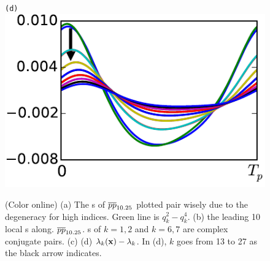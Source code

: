 \documentclass[prl,aps,preprint,showpacs]{revtex4-1} %
\begin{document}
\begin{figure}[h]
\begin{minipage}{.23\textwidth}
  \end{minipage}
  \begin{minipage}{.23\textwidth}
    \centering \small{\texttt{(d)}}
    \includegraphics[width=\textwidth]{localFE3}
  \end{minipage}
  \caption{(Color online) (a) The \Fe s of ${\overline{pp}}_{10.25}$ plotted
    pair wisely due to the degeneracy for high indices. Green line
    is $q_k^2-q_k^4$. (b) the leading 10 local \Fe s along.
    ${\overline{pp}}_{10.25}$. \Fv s of $k = 1, 2$ and $k=6, 7$
    are complex conjugate pairs.
    (c) (d) $\lambda_k(\mathbf{x}) - \lambda_k$.
    In (d), $k$ goes from 13 to 27 as the black arrow indicates.
  }
  \label{fig:fe}
\end{figure}
\end{document}
